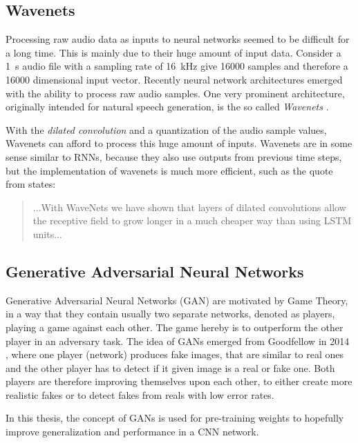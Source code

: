 \subsection{Wavenets}\label{sec:prev_nn_wavenet}
Processing raw audio data as inputs to neural networks seemed to be difficult for a long time.
This is mainly due to their huge amount of input data. 
Consider a \SI{1}{\second} audio file with a sampling rate of \SI{16}{\kilo\hertz} give 16000 samples and therefore a 16000 dimensional input vector.
Recently neural network architectures emerged with the ability to process raw audio samples.
One very prominent architecture, originally intended for natural speech generation, is the so called \emph{Wavenets} \cite{Oord2016}.

With the \emph{dilated convolution} and a quantization of the audio sample values, Wavenets can afford to process this huge amount of inputs.
Wavenets are in some sense similar to RNNs, because they also use outputs from previous time steps, but the implementation of wavenets is much more efficient, such as the quote from \cite{Oord2016} states:
\begin{quote}
  ...With WaveNets we have shown that layers of dilated convolutions allow the receptive field to grow longer in a much cheaper way than using LSTM units...
\end{quote}



\subsection{Generative Adversarial Neural Networks}\label{sec:prev_nn_adv}
Generative Adversarial Neural Networks (GAN) are motivated by Game Theory, in a way that they contain usually two separate networks, denoted as players, playing a game against each other.
The game hereby is to outperform the other player in an adversary task.
The idea of GANs emerged from Goodfellow in 2014 \cite{Goodfellow2014}, where one player (network) produces fake images, that are similar to real ones and the other player has to detect if it given image is a real or fake one.
Both players are therefore improving themselves upon each other, to either create more realistic fakes or to detect fakes from reals with low error rates.

In this thesis, the concept of GANs is used for pre-training weights to hopefully improve generalization and performance in a CNN network.